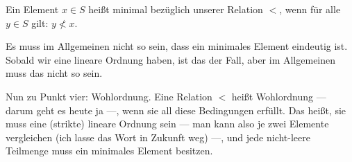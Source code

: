 \begin{math-stroke}
\end{math-stroke}

\begin{spoken-clean}[00:31:13 - 00:32:01]
Ein Element $x \in S$ heißt minimal bezüglich unserer Relation $<$, wenn für alle $y \in S$ gilt: $y \not< x$.

Es muss im Allgemeinen nicht so sein, dass ein minimales Element eindeutig ist. Sobald wir eine lineare Ordnung haben, ist das der Fall, aber im Allgemeinen muss das nicht so sein.
\end{spoken-clean}

\begin{math-stroke}
\end{math-stroke}

\begin{spoken-clean}[00:32:01 - 00:33:16]
Nun zu Punkt vier: Wohlordnung. Eine Relation $<$ heißt Wohlordnung --- darum geht es heute ja ---, wenn sie all diese Bedingungen erfüllt. Das heißt, sie muss eine (strikte) lineare Ordnung sein --- man kann also je zwei Elemente vergleichen (ich lasse das Wort  in Zukunft weg) ---, und jede nicht-leere Teilmenge muss ein minimales Element besitzen.
\end{spoken-clean}

